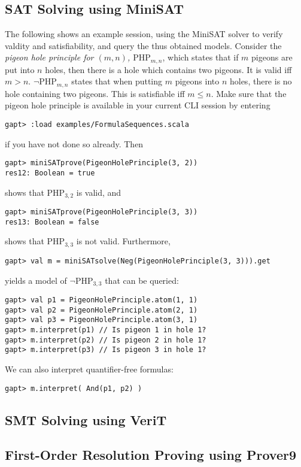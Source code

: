 \documentclass[a4paper,11pt]{article}
\begin{document}
\subsection{SAT Solving using MiniSAT}
%
The following shows an example session, using the MiniSAT solver
to verify valdity and satisfiability, and query the thus obtained models.
Consider the {\em pigeon hole principle for $(m, n)$, $\mathrm{PHP}_{m,n}$}, which states that if $m$ pigeons
are put into $n$ holes, then there is a hole which contains two pigeons. It is valid
iff $m>n$. $\neg\mathrm{PHP}_{m,n}$ states that when putting $m$ pigeons into $n$ holes, there
is no hole containing two pigeons. This is satisfiable iff $m\leq n$. Make sure
that the pigeon hole principle is available in your current CLI session 
by entering
\begin{lstlisting}
gapt> :load examples/FormulaSequences.scala
\end{lstlisting}
if you have not done so already. Then
\begin{lstlisting}
gapt> miniSATprove(PigeonHolePrinciple(3, 2))
res12: Boolean = true
\end{lstlisting}
shows that $\mathrm{PHP}_{3,2}$ is valid, and
\begin{lstlisting}
gapt> miniSATprove(PigeonHolePrinciple(3, 3))
res13: Boolean = false
\end{lstlisting}
shows that $\mathrm{PHP}_{3,3}$ is not valid.
Furthermore,
\begin{lstlisting}
gapt> val m = miniSATsolve(Neg(PigeonHolePrinciple(3, 3))).get
\end{lstlisting}
yields a model of $\neg\mathrm{PHP}_{3,3}$ that can be queried:
\begin{lstlisting}
gapt> val p1 = PigeonHolePrinciple.atom(1, 1)
gapt> val p2 = PigeonHolePrinciple.atom(2, 1)
gapt> val p3 = PigeonHolePrinciple.atom(3, 1)
gapt> m.interpret(p1) // Is pigeon 1 in hole 1?
gapt> m.interpret(p2) // Is pigeon 2 in hole 1?
gapt> m.interpret(p3) // Is pigeon 3 in hole 1?
\end{lstlisting}
We can also interpret quantifier-free formulas:
\begin{lstlisting}
gapt> m.interpret( And(p1, p2) )
\end{lstlisting}

\subsection{SMT Solving using VeriT}


\subsection{First-Order Resolution Proving using Prover9}
\end{document}

